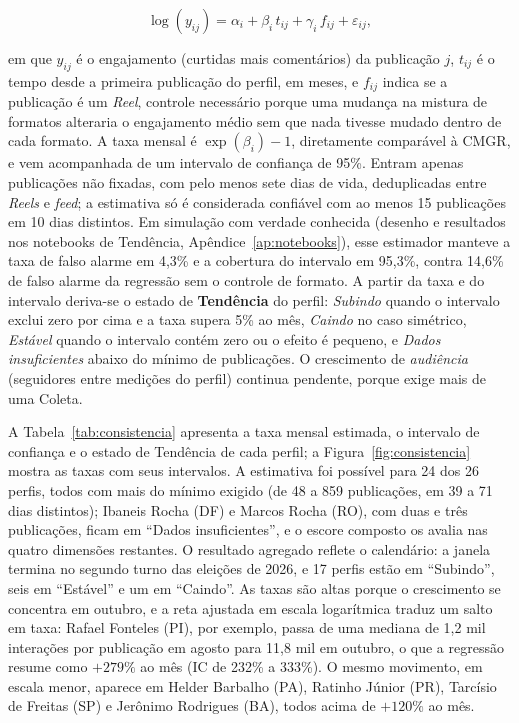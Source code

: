 \begin{equation}
\log(y_{ij}) = \alpha_i + \beta_i\, t_{ij} + \gamma_i\, f_{ij} + \varepsilon_{ij},
\label{eq:consistencia}
\end{equation}

\noindent em que $y_{ij}$ é o engajamento (curtidas mais comentários) da publicação $j$, $t_{ij}$ é o tempo desde a primeira publicação do perfil, em meses, e $f_{ij}$ indica se a publicação é um \emph{Reel}, controle necessário porque uma mudança na mistura de formatos alteraria o engajamento médio sem que nada tivesse mudado dentro de cada formato. A taxa mensal é $\exp(\beta_i)-1$, diretamente comparável à CMGR, e vem acompanhada de um intervalo de confiança de 95\%. Entram apenas publicações não fixadas, com pelo menos sete dias de vida, deduplicadas entre \emph{Reels} e \emph{feed}; a estimativa só é considerada confiável com ao menos 15 publicações em 10 dias distintos. Em simulação com verdade conhecida (desenho e resultados nos notebooks de Tendência, Apêndice~\ref{ap:notebooks}), esse estimador manteve a taxa de falso alarme em 4,3\% e a cobertura do intervalo em 95,3\%, contra 14,6\% de falso alarme da regressão sem o controle de formato. A partir da taxa e do intervalo deriva-se o estado de \textbf{Tendência} do perfil: \emph{Subindo} quando o intervalo exclui zero por cima e a taxa supera 5\% ao mês, \emph{Caindo} no caso simétrico, \emph{Estável} quando o intervalo contém zero ou o efeito é pequeno, e \emph{Dados insuficientes} abaixo do mínimo de publicações. O crescimento de \emph{audiência} (seguidores entre medições do perfil) continua pendente, porque exige mais de uma Coleta.

A Tabela~\ref{tab:consistencia} apresenta a taxa mensal estimada, o intervalo de confiança e o estado de Tendência de cada perfil; a Figura~\ref{fig:consistencia} mostra as taxas com seus intervalos. A estimativa foi possível para 24 dos 26 perfis, todos com mais do mínimo exigido (de 48 a 859 publicações, em 39 a 71 dias distintos); Ibaneis Rocha (DF) e Marcos Rocha (RO), com duas e três publicações, ficam em ``Dados insuficientes'', e o escore composto os avalia nas quatro dimensões restantes. O resultado agregado reflete o calendário: a janela termina no segundo turno das eleições de 2026, e 17 perfis estão em ``Subindo'', seis em ``Estável'' e um em ``Caindo''. As taxas são altas porque o crescimento se concentra em outubro, e a reta ajustada em escala logarítmica traduz um salto em taxa: Rafael Fonteles (PI), por exemplo, passa de uma mediana de 1,2 mil interações por publicação em agosto para 11,8 mil em outubro, o que a regressão resume como $+279\%$ ao mês (IC de 232\% a 333\%). O mesmo movimento, em escala menor, aparece em Helder Barbalho (PA), Ratinho Júnior (PR), Tarcísio de Freitas (SP) e Jerônimo Rodrigues (BA), todos acima de $+120\%$ ao mês.

